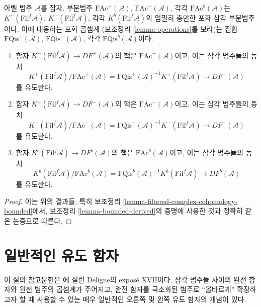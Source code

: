 \begin{lemma}
\label{lemma-filtered-bounded-derived}
아벨 범주 $\mathcal{A}$를 잡자. 부분범주
$\text{FAc}^{+}(\mathcal{A})$, $\text{FAc}^{-}(\mathcal{A})$,
각각 $\text{FAc}^b(\mathcal{A})$는
$K^{+}(\text{Fil}^f\mathcal{A})$, $K^{-}(\text{Fil}^f\mathcal{A})$,
각각 $K^b(\text{Fil}^f\mathcal{A})$의 엄밀히 충만한 포화 삼각
부분범주이다. 이에 대응하는 포화 곱셈계
(보조정리 \ref{lemma-operations}를 보라)는 집합
$\text{FQis}^{+}(\mathcal{A})$, $\text{FQis}^{-}(\mathcal{A})$,
각각 $\text{FQis}^b(\mathcal{A})$이다.
\begin{enumerate}
\item 함자 $K^{+}(\text{Fil}^f\mathcal{A}) \to DF^{+}(\mathcal{A})$의
핵은 $\text{FAc}^{+}(\mathcal{A})$이고, 이는 삼각 범주들의 동치
$$
K^{+}(\text{Fil}^f\mathcal{A})/\text{FAc}^{+}(\mathcal{A}) =
\text{FQis}^{+}(\mathcal{A})^{-1}K^{+}(\text{Fil}^f\mathcal{A})
\longrightarrow
DF^{+}(\mathcal{A})
$$
를 유도한다.
\item 함자 $K^{-}(\text{Fil}^f\mathcal{A}) \to DF^{-}(\mathcal{A})$의
핵은 $\text{FAc}^{-}(\mathcal{A})$이고, 이는 삼각 범주들의 동치
$$
K^{-}(\text{Fil}^f\mathcal{A})/\text{FAc}^{-}(\mathcal{A}) =
\text{FQis}^{-}(\mathcal{A})^{-1}K^{-}(\text{Fil}^f\mathcal{A})
\longrightarrow
DF^{-}(\mathcal{A})
$$
를 유도한다.
\item 함자 $K^b(\text{Fil}^f\mathcal{A}) \to DF^b(\mathcal{A})$의
핵은 $\text{FAc}^b(\mathcal{A})$이고, 이는 삼각 범주들의 동치
$$
K^b(\text{Fil}^f\mathcal{A})/\text{FAc}^b(\mathcal{A}) =
\text{FQis}^b(\mathcal{A})^{-1}K^b(\text{Fil}^f\mathcal{A})
\longrightarrow
DF^b(\mathcal{A})
$$
를 유도한다.
\end{enumerate}
\end{lemma}

\begin{proof}
이는 위의 결과들, 특히 보조정리
\ref{lemma-filtered-complex-cohomology-bounded}에서, 보조정리
\ref{lemma-bounded-derived}의 증명에 사용한 것과 정확히 같은 논증으로
따른다.
\end{proof}
\section{일반적인 유도 함자}
\label{section-derived-functors}

\noindent
이 절의 참고문헌은 \cite{SGA4}에 실린 Deligne의 expos\'e XVII이다.
삼각 범주들 사이의 완전 함자와 원천 범주의 곱셈계가 주어지고, 완전 함자를
국소화된 범주로 “올바르게” 확장하고자 할 때 사용할 수 있는 매우 일반적인
오른쪽 및 왼쪽 유도 함자의 개념이 있다.

